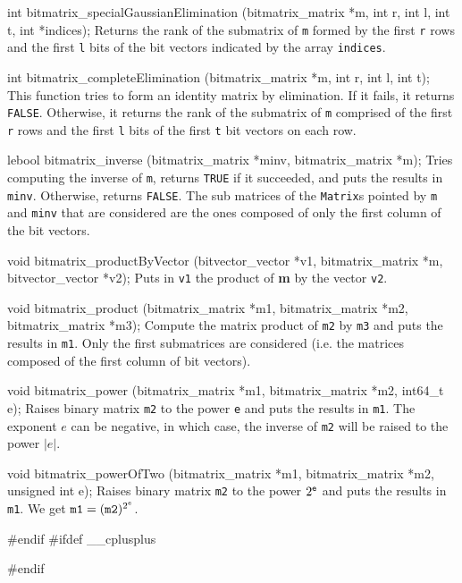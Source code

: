 {int bitmatrix_specialGaussianElimination (bitmatrix_matrix *m,
                                          int r, int l, int t, int *indices);
\endcode
 \tab
Returns the rank of the submatrix of {\tt m} formed by the first {\tt r} rows
and the first {\tt l} bits of the bit vectors indicated by the array {\tt indices}.
 \endtab
 \code

int bitmatrix_completeElimination (bitmatrix_matrix *m, int r, int l, int t);
\endcode
 \tab
This function tries to form an identity matrix by elimination. If it fails, it returns {\tt FALSE}.
Otherwise, it returns the rank of the submatrix of {\tt m} comprised of the first
{\tt r} rows and the first {\tt l} bits of the first {\tt t} bit vectors on each row.
 \endtab
\code

lebool bitmatrix_inverse (bitmatrix_matrix *minv, bitmatrix_matrix *m);
\endcode
\tab
Tries computing the inverse of {\tt m}, returns {\tt TRUE} if it succeeded, and puts the results in {\tt minv}.
Otherwise, returns {\tt FALSE}.
The sub matrices of the {\tt Matrix}s pointed by {\tt m} and {\tt minv} that
are considered are the ones composed of only the first column of the bit vectors.
 \endtab
\code

void bitmatrix_productByVector (bitvector_vector *v1, bitmatrix_matrix *m,
                                bitvector_vector *v2);
\endcode
\tab
Puts in {\tt v1} the product of {\bf m} by the vector {\tt v2}.
 \endtab
\code

void bitmatrix_product (bitmatrix_matrix *m1, bitmatrix_matrix *m2,
                        bitmatrix_matrix *m3);
\endcode
\tab
Compute the matrix product of {\tt m2} by {\tt m3} and puts the results in {\tt m1}.
Only the first submatrices are considered (i.e. the matrices composed of the first column of bit vectors).
\endtab
\code

void bitmatrix_power (bitmatrix_matrix *m1, bitmatrix_matrix *m2, int64_t e);
\endcode
\tab
Raises binary matrix {\tt m2} to the power {\tt e} and puts the results in {\tt m1}.
The exponent $e$ can be negative, in which case, the inverse of {\tt m2}
will be raised to the power $|e|$.
\endtab
\code

void bitmatrix_powerOfTwo (bitmatrix_matrix *m1, bitmatrix_matrix *m2,
                           unsigned int e);
\endcode
\tab
Raises binary matrix {\tt m2} to the power $2^{\tt e}$ and puts the results in {\tt m1}.
We get ${\tt m1} = ({\tt m2})^{2^{e}}$.
\endtab

\code\hide
#endif
#ifdef __cplusplus
}
#endif
\endhide\endcode
